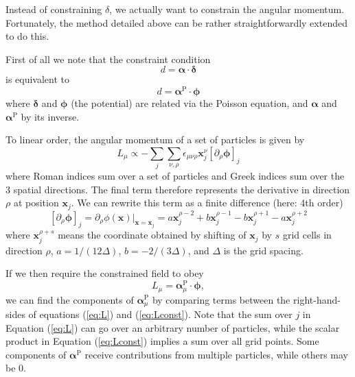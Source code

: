 \documentclass[11pt,a4paper,preprint]{aastex}
\newcommand{\bmath}[1]{\ensuremath{\bm{#1}}}
\renewcommand{\vec}[1]{\bmath{#1}}
\begin{document}
Instead of constraining $\delta$, we actually want to constrain the angular momentum. Fortunately, the method detailed above can be rather straightforwardly extended to do this.

First of all we note that the constraint condition
\begin{equation}
d= \vec{\alpha} \cdot \vec{\delta}
\end{equation}
is equivalent to
\begin{equation}
d= \vec{\alpha}^{\mathrm{P}} \cdot \vec{\phi}
\end{equation}
where $\vec{\delta}$ and $\vec{\phi}$ (the potential) are related via the Poisson equation, and $\vec{\alpha}$ and $\vec{\alpha}^{\mathrm{P}}$ by its inverse.

To linear order, the angular momentum of a set of particles is given by
\begin{equation}
L_{\mu} \propto - \sum_j \sum_{\nu, \rho} \epsilon_{\mu \nu \rho} \vec{x}_j^{\nu} \left[ \partial_{\rho} \vec{\phi} \right] _j
\label{eq:L}
\end{equation}
where Roman indices sum over a set of particles and Greek indices sum over the 3 spatial directions. The final term therefore represents the derivative in direction $\rho$ at position $\vec{x}_j$. We can rewrite this term as a finite difference (here: 4th order)
\begin{equation}
\left[ \partial_{\rho} \vec{\phi} \right] _j =  \partial_{\rho} \phi(\vec{x})|_{\vec{x}=\vec{x}_j} = a \vec{x}_j^{\rho-2} +b\vec{x}_j^{\rho-1} -b \vec{x}_j^{\rho+1} -a \vec{x}_j^{\rho+2}
\end{equation}
where $\vec{x}_j^{\rho+s}$ means the coordinate obtained by shifting of $\vec{x}_j$ by $s$ grid cells in direction $\rho$, $a=1/(12 \Delta) $, $b=-2/(3 \Delta)$, and $\Delta$ is the grid spacing.

If we then require the constrained field to obey
\begin{equation}
L_{\mu} = \vec{\alpha}_{\mu}^{\mathrm{P}} \cdot \vec{\phi},
\label{eq:Lconst}
\end{equation}
we can find the components of $\vec{\alpha}_{\mu}^{\mathrm{P}}$ by comparing terms between the right-hand-sides of equations (\ref{eq:L}) and (\ref{eq:Lconst}). Note that the sum over $j$ in Equation (\ref{eq:L}) can go over an arbitrary number of particles, while the scalar product in Equation (\ref{eq:Lconst}) implies a sum over all grid points. Some components of $\vec{\alpha}^{\mathrm{P}}$ receive contributions from multiple particles, while others may be 0.
\end{document}
